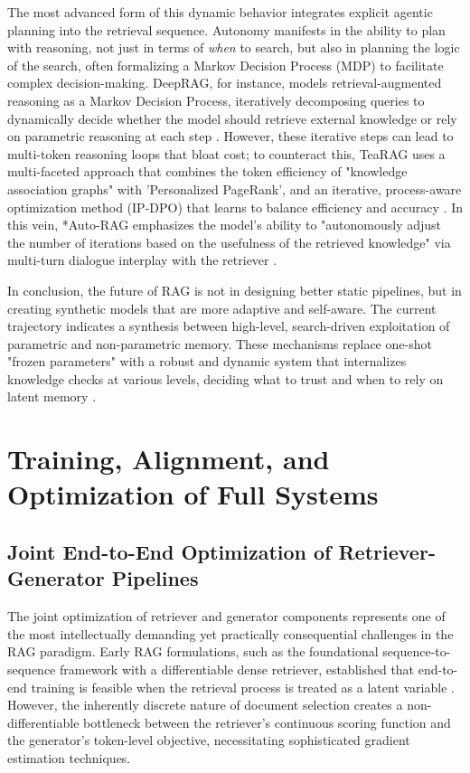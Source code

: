 \documentclass[11pt,a4paper]{article}
\begin{document}
The most advanced form of this dynamic behavior integrates explicit agentic planning into the retrieval sequence. Autonomy manifests in the ability to plan with reasoning, not just in terms of \emph{when} to search, but also in planning the logic of the search, often formalizing a Markov Decision Process (MDP) to facilitate complex decision-making. DeepRAG, for instance, models retrieval-augmented reasoning as a Markov Decision Process, iteratively decomposing queries to dynamically decide whether the model should retrieve external knowledge or rely on parametric reasoning at each step \cite{arxiv:2502.01142v2}. However, these iterative steps can lead to multi-token reasoning loops that bloat cost; to counteract this, TeaRAG uses a multi-faceted approach that combines the token efficiency of "knowledge association graphs" with 'Personalized PageRank', and an iterative, process-aware optimization method (IP-DPO) that learns to balance efficiency and accuracy \cite{arxiv:2511.05385v2}. In this vein, *Auto-RAG emphasizes the model's ability to "autonomously adjust the number of iterations based on the usefulness of the retrieved knowledge" via multi-turn dialogue interplay with the retriever \cite{arxiv:2411.19443v1}.

In conclusion, the future of RAG is not in designing better static pipelines, but in creating synthetic models that are more adaptive and self-aware. The current trajectory indicates a synthesis between high-level, search-driven exploitation of parametric and non-parametric memory. These mechanisms replace one-shot "frozen parameters" with a robust and dynamic system that internalizes knowledge checks at various levels, deciding what to trust and when to rely on latent memory \cite{arxiv:2410.05162v1}.


\section{Training, Alignment, and Optimization of Full Systems}



\subsection{Joint End-to-End Optimization of Retriever-Generator Pipelines}


The joint optimization of retriever and generator components represents one of the most intellectually demanding yet practically consequential challenges in the RAG paradigm. Early RAG formulations, such as the foundational sequence-to-sequence framework with a differentiable dense retriever, established that end-to-end training is feasible when the retrieval process is treated as a latent variable \cite{arxiv:2005.11401v4}. However, the inherently discrete nature of document selection creates a non-differentiable bottleneck between the retriever's continuous scoring function and the generator's token-level objective, necessitating sophisticated gradient estimation techniques.
\end{document}
